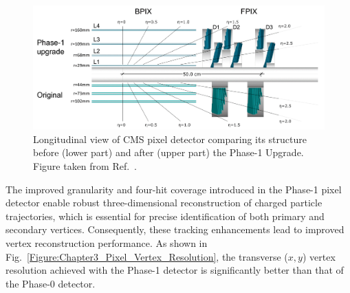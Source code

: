 \begin{figure}[h]
\centering
\includegraphics[width=1\textwidth]{Figures/Chapter3/CMS_Pixel_Upgrade.pdf}
\caption[Longitudinal view of CMS pixel detector before and after Phase-1 Upgrade]{Longitudinal view of CMS pixel detector comparing its structure before (lower part) and after (upper part) the Phase-1 Upgrade. Figure taken from Ref.~\cite{CMS_Detector_Run3}.}
\label{Figure:Chapter3_Pixel_Upgrade}
\end{figure}

The improved granularity and four-hit coverage introduced in the Phase-1 pixel detector enable robust three-dimensional reconstruction of charged particle trajectories, which is essential for precise identification of both primary and secondary vertices. Consequently, these tracking enhancements lead to improved vertex reconstruction performance. As shown in Fig.~\ref{Figure:Chapter3_Pixel_Vertex_Resolution}, the transverse ($x,y$) vertex resolution achieved with the Phase-1 detector is significantly better than that of the Phase-0 detector.

